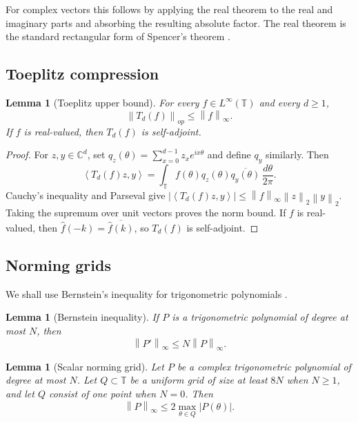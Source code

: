 \documentclass[11pt]{amsart}
\newtheorem{lemma}[theorem]{Lemma}
\theoremstyle{definition}
\newcommand{\C}{\mathbb C}
\newcommand{\T}{\mathbb T}
\newcommand{\norm}[1]{\left\lVert #1\right\rVert}
\newcommand{\abs}[1]{\left\lvert #1\right\rvert}
\newcommand{\ip}[2]{\left\langle #1,#2\right\rangle}
\begin{document}
For complex vectors this follows by applying the real theorem to the real and
imaginary parts and absorbing the resulting absolute factor.  The real theorem
is the standard rectangular form of Spencer's theorem
\cite{Spencer1985,Gluskin1989,Chazelle2000,Matousek1999,Giannopoulos1997}.

\subsection{Toeplitz compression}

\begin{lemma}[Toeplitz upper bound]\label{lem:toeplitz-upper}
For every $f\in L^\infty(\T)$ and every $d\ge1$,
\[
   \norm{T_d(f)}_{op}\le \norm{f}_\infty .
\]
If $f$ is real-valued, then $T_d(f)$ is self-adjoint.
\end{lemma}

\begin{proof}
For $z,y\in\C^d$, set
$q_z(\theta)=\sum_{x=0}^{d-1}z_x e^{ix\theta}$ and define $q_y$ similarly.  Then
\[
   \ip{T_d(f)z}{y}
   =\int_\T f(\theta)q_z(\theta)\overline{q_y(\theta)}\,
       \frac{d\theta}{2\pi} .
\]
Cauchy's inequality and Parseval give
$\abs{\ip{T_d(f)z}{y}}\le\norm{f}_\infty\norm z_2\norm y_2$.  Taking the
supremum over unit vectors proves the norm bound.  If $f$ is real-valued, then
$\widehat f(-k)=\overline{\widehat f(k)}$, so $T_d(f)$ is self-adjoint.
\end{proof}

\subsection{Norming grids}

We shall use Bernstein's inequality for trigonometric polynomials
\cite[Chapter X]{Zygmund1959}.

\begin{lemma}[Bernstein inequality]\label{lem:bernstein}
If $P$ is a trigonometric polynomial of degree at most $N$, then
\[
   \norm{P'}_\infty\le N\norm{P}_\infty .
\]
\end{lemma}

\begin{lemma}[Scalar norming grid]\label{lem:grid}
Let $P$ be a complex trigonometric polynomial of degree at most $N$.  Let
$Q\subset\T$ be a uniform grid of size at least $8N$ when $N\ge1$, and let
$Q$ consist of one point when $N=0$.  Then
\[
   \norm{P}_\infty\le2\max_{\theta\in Q}\abs{P(\theta)} .
\]
\end{lemma}
\end{document}
